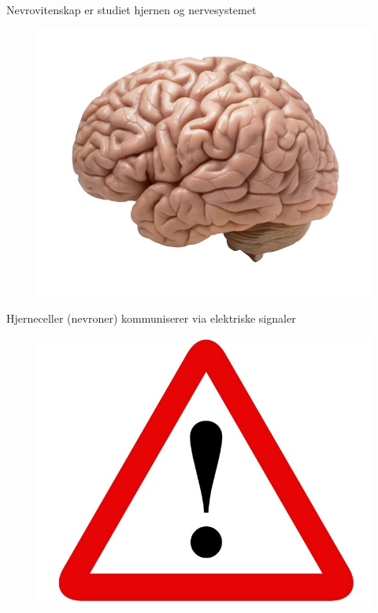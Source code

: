 \documentclass[presentation]{beamer}
\begin{document}
\begin{frame}{Nevrovitenskap er studiet hjernen og nervesystemet}
   \begin{figure}
       {\includegraphics[width=1\textwidth]{brain.jpg}}
\end{figure}
\end{frame}

\begin{frame}{Hjerneceller (nevroner) kommuniserer via elektriske signaler}
   \begin{figure}
       {\includegraphics[width=1\textwidth]{alert.jpg}}
\end{figure}
\end{frame}
\end{document}
